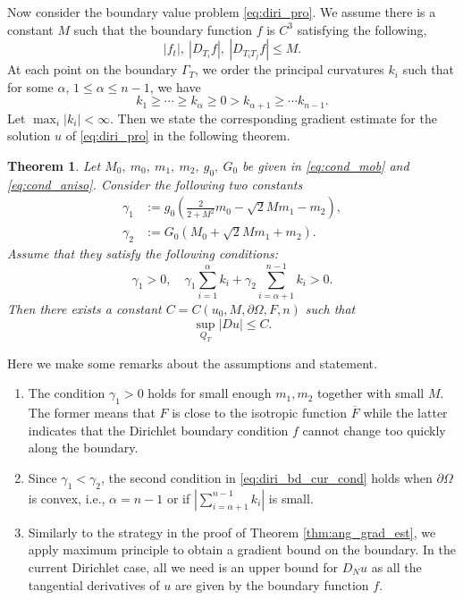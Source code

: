 \documentclass[12pt]{article}
\numberwithin{equation}{section}
\theoremstyle{plain}
\newtheorem{theorem}{Theorem}[section]
\theoremstyle{definition}
\theoremstyle{remark}
\begin{document}
Now consider the boundary value problem \eqref{eq:diri_pro}. We assume there is a constant $M$ such that the boundary
function $f$ is $C^3$ satisfying the following,
\begin{equation}\label{eq:diri_f_ass}
    |f_t|,\ |D_{T_i} f|,\ |D_{T_i T_j} f| \leq M.
\end{equation}
At each point on the boundary $\Gamma_T$, we order the principal curvatures $k_i$ such that for some $\alpha$, $1 \leq \alpha \leq n-1$, we have 
\begin{equation}
    k_1 \geq \cdots \geq k_{\alpha} \geq 0 > k_{\alpha+1} \geq \cdots k_{n-1}.
\end{equation}
Let $\max_i |k_i| <
\infty$. Then we state the corresponding gradient estimate for the solution $u$ of 
\eqref{eq:diri_pro} in the following theorem.
\begin{theorem} \label{thm:ell_grad_est}
Let $M_0,\ m_0,\ m_1,\ m_2,\ g_0,\ G_0$ be given in \eqref{eq:cond_mob} and \eqref{eq:cond_aniso}. Consider the following two constants
\begin{equation}
\begin{split}
    \gamma_1 & := g_0 \left( \frac{2}{2+M^2} m_0 -\sqrt{2} M m_1 - m_2 \right), \\  
    \gamma_2 & := G_0 \left( M_0 +\sqrt{2} M m_1 +m_2 \right).
\end{split}
\end{equation}
Assume that they satisfy the following conditions:
\begin{equation} \label{eq:diri_bd_cur_cond}
    \gamma_1 > 0, \quad \gamma_1 \sum_{i=1}^{\alpha} k_i + \gamma_2\sum_{i=\alpha+1}^{n-1} k_i >0.
\end{equation}
Then there exists a constant $C=C(u_0, M, \partial\Omega, F, n )$ such that
\begin{equation*}
    \sup_{Q_T} |Du| \leq C.
\end{equation*}
\end{theorem}
Here we make some remarks about the assumptions and statement.
\begin{enumerate}
\item 
The condition $\gamma_1 > 0$ holds for small enough $m_1, m_2$ together
with small $M$. The former means that  $F$ is close to 
the isotropic function $\overline{F}$ while the latter indicates that
the Dirichlet boundary condition $f$ cannot change too quickly along the boundary.

\item Since $\gamma_1 < \gamma_2$, the second condition in \eqref{eq:diri_bd_cur_cond} holds when 
$\partial\Omega$ is convex, i.e., $\alpha=n-1$ or if $\left|\sum_{i=\alpha+1}^{n-1} k_i\right|$ is small.

\item Similarly to the strategy in the proof of Theorem \ref{thm:ang_grad_est}, we apply maximum principle to obtain a gradient bound on the boundary. In the current Dirichlet case, all we need is an upper bound for $D_N u$ as all the tangential derivatives of $u$ are given 
by the boundary function $f$.
\end{enumerate}
\end{document}
